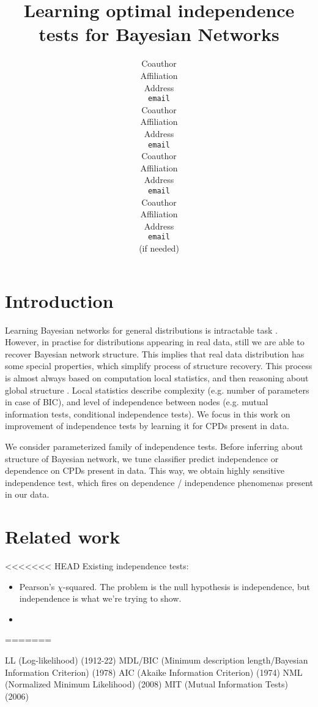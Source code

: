 \documentclass{article} %
\title{Learning optimal independence tests for Bayesian Networks}
\author{
\And
Coauthor \\
Affiliation \\
Address \\
\texttt{email} \\
\AND
Coauthor \\
Affiliation \\
Address \\
\texttt{email} \\
\And
Coauthor \\
Affiliation \\
Address \\
\texttt{email} \\
\And
Coauthor \\
Affiliation \\
Address \\
\texttt{email} \\
(if needed)\\
}
\begin{document}
\maketitle

\begin{abstract}

\end{abstract}


\section{Introduction}
Learning Bayesian networks for general distributions is
intractable task \cite{chickering1996learning}. However, in practise 
for distributions appearing in real data, still we are able to 
recover Bayesian network structure. This implies that real data
distribution has some special properties, which simplify process
of structure recovery. This process is almost always
based on computation local statistics, and then 
reasoning about global structure \cite{jaakkola2010learning, tsamardinos2006max}. 
Local statistics describe
complexity (e.g. number of parameters in case of BIC), and 
level of independence between nodes (e.g. mutual information tests, 
conditional independence tests). 
We focus in this work on improvement of independence tests by 
learning it for CPDs present in data.



We consider parameterized family of independence tests. 
Before inferring about structure of Bayesian network, we tune classifier 
predict independence or dependence on CPDs present in data. 
This way, we obtain highly sensitive independence test, which
fires on dependence / independence phenomenas present in our data. 


\section{Related work}
<<<<<<< HEAD
Existing independence tests:
\begin{itemize}
\item Pearson's $\chi$-squared.  The problem is the null hypothesis is independence, but independence is what we're trying to show.
\item
\end{itemize}
=======

LL (Log-likelihood) (1912-22)
MDL/BIC (Minimum description length/Bayesian Information Criterion) (1978)
AIC (Akaike Information Criterion) (1974)
NML (Normalized Minimum Likelihood) (2008)
MIT (Mutual Information Tests) (2006)
\end{document}
